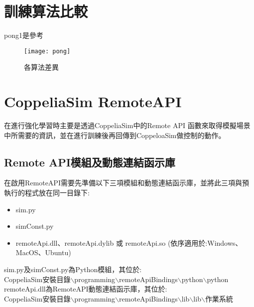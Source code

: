 \section{訓練算法比較}
pong1是參考
\begin{table}[hbt!]
\center\large
{}
\caption{\Large 算法標示}
\end{table}

\begin{figure}[hbt!]
\begin{center}
\texttt{[image: pong]}
\caption{\Large 各算法差異}
\label{fig.比較中斷數據}
\end{center}
\end{figure}
 
\section{CoppeliaSim RemoteAPI}
在進行強化學習時主要是透過CoppeliaSim中的Remote API 函數來取得模擬場景中所需要的資訊，並在進行訓練後再回傳到CoppeloaSim做控制的動作。\\
\subsection{Remote API模組及動態連結函示庫}
在啟用RemoteAPI需要先準備以下三項模組和動態連結函示庫，並將此三項與預執行的程式放在同一目錄下:
\begin{itemize}
\item sim.py
\item simConst.py
\item remoteApi.dll、remoteApi.dylib 或 remoteApi.so (依序適用於:Windows、MacOS、Ubuntu)
\end{itemize}
sim.py及simConst.py為Python模組，其位於:\\
CoppeliaSim安裝目錄$\backslash$programming$\backslash$remoteApiBindings$\backslash$python$\backslash$python\\
remoteApi.dll為RemoteAPI動態連結函示庫，其位於:\\
CoppeliaSim安裝目錄$\backslash$programming$\backslash$remoteApiBindings$\backslash$lib$\backslash$lib$\backslash$作業系統\\
